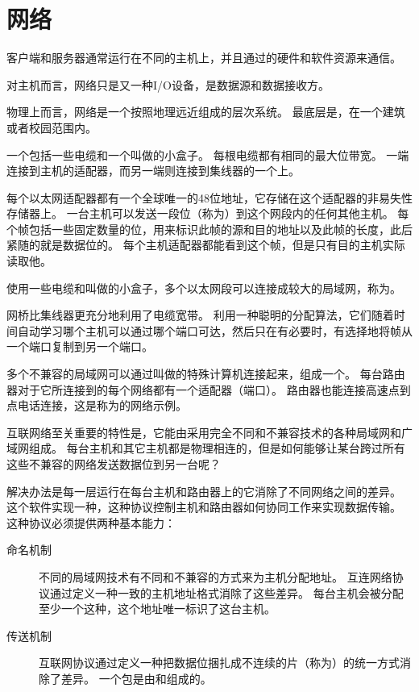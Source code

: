 
\section{网络}
{
    客户端和服务器通常运行在不同的主机上，并且通过的硬件和软件资源来通信。

    对主机而言，网络只是又一种I/O设备，是数据源和数据接收方。

    物理上而言，网络是一个按照地理远近组成的层次系统。
    最底层是，在一个建筑或者校园范围内。

    一个包括一些电缆和一个叫做的小盒子。
    每根电缆都有相同的最大位带宽。
    一端连接到主机的适配器，而另一端则连接到集线器的一个上。

    每个以太网适配器都有一个全球唯一的48位地址，它存储在这个适配器的非易失性存储器上。
    一台主机可以发送一段位（称为）到这个网段内的任何其他主机。
    每个帧包括一些固定数量的位，用来标识此帧的源和目的地址以及此帧的长度，此后紧随的就是数据位的。
    每个主机适配器都能看到这个帧，但是只有目的主机实际读取他。

    使用一些电缆和叫做的小盒子，多个以太网段可以连接成较大的局域网，称为。

    网桥比集线器更充分地利用了电缆宽带。
    利用一种聪明的分配算法，它们随着时间自动学习哪个主机可以通过哪个端口可达，然后只在有必要时，有选择地将帧从一个端口复制到另一个端口。

    多个不兼容的局域网可以通过叫做的特殊计算机连接起来，组成一个。
    每台路由器对于它所连接到的每个网络都有一个适配器（端口）。
    路由器也能连接高速点到点电话连接，这是称为的网络示例。

    互联网络至关重要的特性是，它能由采用完全不同和不兼容技术的各种局域网和广域网组成。
    每台主机和其它主机都是物理相连的，但是如何能够让某台跨过所有这些不兼容的网络发送数据位到另一台呢？

    解决办法是每一层运行在每台主机和路由器上的它消除了不同网络之间的差异。
    这个软件实现一种，这种协议控制主机和路由器如何协同工作来实现数据传输。
    这种协议必须提供两种基本能力：

    \begin{description}
        \item[命名机制]
        {
            不同的局域网技术有不同和不兼容的方式来为主机分配地址。
            互连网络协议通过定义一种一致的主机地址格式消除了这些差异。
            每台主机会被分配至少一个这种，这个地址唯一标识了这台主机。
        }
        \item[传送机制]
        {
            互联网协议通过定义一种把数据位捆扎成不连续的片（称为）的统一方式消除了差异。
            一个包是由和组成的。
        }
    \end{description}
}
